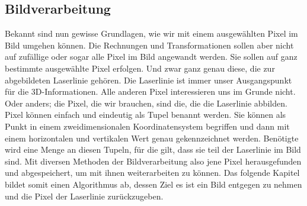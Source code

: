 	\subsection{Bildverarbeitung}
	Bekannt sind nun gewisse Grundlagen, wie wir mit einem ausgewählten Pixel im Bild umgehen können. Die Rechnungen und Transformationen sollen aber nicht auf zufällige oder sogar alle Pixel im Bild angewandt werden. Sie sollen auf ganz bestimmte ausgewählte Pixel erfolgen. Und zwar ganz genau diese, die zur abgebildeten Laserlinie gehören. Die Laserlinie ist immer unser Ausgangspunkt für die 3D-Informationen. Alle anderen Pixel interessieren uns im Grunde nicht. Oder anders; die Pixel, die wir brauchen, sind die, die die Laserlinie abbilden. \newline
	Pixel können einfach und eindeutig als Tupel benannt werden. Sie können als Punkt in einem zweidimensionalen Koordinatensystem begriffen und dann mit einem horizontalen und vertikalen Wert genau gekennzeichnet werden. Benötigte wird eine Menge an diesen Tupeln, für die gilt, dass sie teil der Laserlinie im Bild sind. Mit diversen Methoden der Bildverarbeitung also jene Pixel herausgefunden und abgespeichert, um mit ihnen weiterarbeiten zu können. Das folgende Kapitel bildet somit einen Algorithmus ab, dessen Ziel es ist ein Bild entgegen zu nehmen und die Pixel der Laserlinie zurückzugeben. 
	
